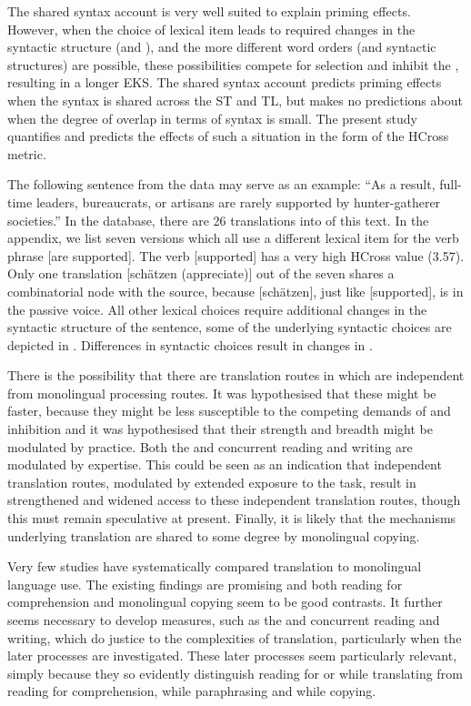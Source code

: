 \documentclass[output=paper]{LSP/langsci}
\begin{document}
\largerpage
The shared syntax account is very well suited to explain priming effects. However, when the choice of lexical item leads to required changes in the syntactic structure (and ), and the more different word orders (and syntactic structures) are possible, these possibilities compete for selection and inhibit the , resulting in a longer EKS. The shared syntax account predicts priming effects when the syntax is shared across the ST and TL, but makes no predictions about when the degree of overlap in terms of syntax is small. The present study quantifies and predicts the effects of such a situation in the form of the HCross metric.

The following sentence from the data may serve as an example: ``As a result, full-time leaders, bureaucrats, or artisans are rarely supported by hunter-gatherer societies.'' In the database, there are 26 translations into  of this text. In the appendix, we list seven versions which all use a different lexical item for the verb phrase [are supported]. The verb [supported] has a very high HCross value (3.57). Only one translation [schätzen (appreciate)] out of the seven shares a combinatorial node with the source, because [schätzen], just like [supported], is in the passive voice. All other lexical choices require additional changes in the syntactic structure of the  sentence, some of the underlying syntactic choices are depicted in . Differences in syntactic choices result in changes in .

There is the possibility that there are translation routes in  which are independent from monolingual processing routes. It was hypothesised that these might be faster, because they might be less susceptible to the competing demands of  and inhibition and it was hypothesised that their strength and breadth might be modulated by practice. Both the  and concurrent reading and writing are modulated by expertise. This could be seen as an indication that independent translation routes, modulated by extended exposure to the task, result in strengthened and widened access to these independent translation routes, though this must remain speculative at present. Finally, it is likely that the mechanisms underlying translation are shared to some degree by monolingual copying.

Very few studies have systematically compared translation to monolingual language use. The existing findings are promising and both reading for comprehension and monolingual copying seem to be good contrasts. It further seems necessary to develop  measures, such as the  and concurrent reading and writing, which do justice to the complexities of translation, particularly when the later processes are investigated. These later processes seem particularly relevant, simply because they so evidently distinguish reading for or while translating from reading for comprehension, while paraphrasing and while copying.
\end{document}
